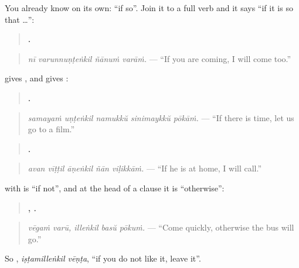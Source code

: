 \begin{grammarlens}[title={Grammar Lens: a full verb, then \ml{എങ്കിൽ}}]
You already know \textbf{} on its own: \textquotedblleft{}if so\textquotedblright{}. Join it to a full verb and it says \textquotedblleft{}if it is so that …\textquotedblright{}:

\begin{quote}
\textbf{   .}
\end{quote}

\begin{quote}
\emph{nī varunnuṇṭeṅkil ñānuṁ varāṁ.} — \textquotedblleft{}If you are coming, I will come too.\textquotedblright{}
\end{quote}

\textbf{} gives \textbf{}, and \textbf{} gives \textbf{}:

\begin{quote}
\textbf{    .}
\end{quote}

\begin{quote}
\emph{samayaṁ uṇṭeṅkil namukkŭ sinimaykkŭ pōkāṁ.} — \textquotedblleft{}If there is time, let us go to a film.\textquotedblright{}
\end{quote}

\begin{quote}
\textbf{    .}
\end{quote}

\begin{quote}
\emph{avan vīṭṭil āṇeṅkil ñān viḷikkāṁ.} — \textquotedblleft{}If he is at home, I will call.\textquotedblright{}
\end{quote}
\end{grammarlens}

\begin{grammarlens}[title={Grammar Lens: \ml{ഇല്ലെങ്കിൽ}, otherwise}]
\textbf{} with \textbf{} is \textquotedblleft{}if not\textquotedblright{}, and at the head of a clause it is \textquotedblleft{}otherwise\textquotedblright{}:

\begin{quote}
\textbf{ ,   .}
\end{quote}

\begin{quote}
\emph{vēgaṁ varū, illeṅkil basŭ pōkuṁ.} — \textquotedblleft{}Come quickly, otherwise the bus will go.\textquotedblright{}
\end{quote}

So \textbf{ }, \emph{iṣṭamilleṅkil vēṇṭa}, \textquotedblleft{}if you do not like it, leave it\textquotedblright{}.
\end{grammarlens}


